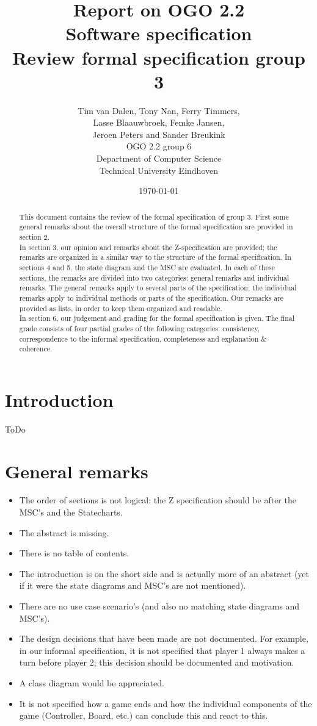 \documentclass[a4paper,11pt]{article}
\title{Report on OGO 2.2 \\ Software specification\\ Review formal specification group 3}
\author{
        Tim van Dalen, Tony Nan, Ferry Timmers, \\ Lasse Blaauwbroek, Femke Jansen, \\Jeroen Peters and Sander Breukink\\ OGO 2.2 group 6 \\
                Department of Computer Science\\
        Technical University Eindhoven\\
}
\date{\today}
\begin{document}
\maketitle

\begin{abstract}
This document contains the review of the formal specification of group 3. First some general remarks about the overall structure of the formal specification are provided in section 2. \\
In section 3, our opinion and remarks about the Z-specification are provided; the remarks are organized in a similar way to the structure of the formal specification. In sections 4 and 5, the state diagram and the MSC are evaluated. In each of these sections, the remarks are divided into two categories: general remarks and individual remarks. The general remarks apply to several parts of the specification; the individual remarks apply to individual methods or parts of the specification. Our remarks are provided as lists, in order to keep them organized and readable. \\
In section 6, our judgement and grading for the formal specification is given. The final grade consists of four partial grades of the following categories: consistency, correspondence to the informal specification, completeness and explanation \& coherence.
\end{abstract}

\newpage
	
	\tableofcontents
	\newpage

    \section{Introduction}
    ToDo

	\section{General remarks}
    \begin{itemize}
        \item The order of sections is not logical: the Z specification should be after the MSC's and the Statecharts.
        \item The abstract is missing.
        \item There is no table of contents.
        \item The introduction is on the short side and is actually more of an abstract (yet if it were the state diagrams and MSC's are not mentioned).
        \item There are no use case scenario's (and also no matching state diagrams and MSC's).
        \item The design decisions that have been made are not documented. For example, in our informal specification, it is not specified that player 1 always makes a turn before player 2; this decision should be documented and motivation.
        \item A class diagram would be appreciated.
        \item It is not specified how a game ends and how the individual components of the game (Controller, Board, etc.) can conclude this and react to this.
    \end{itemize}
	
\end{document}

